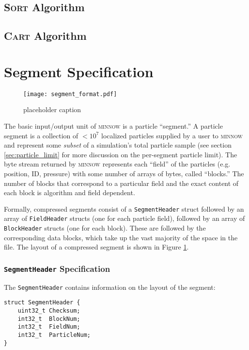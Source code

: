 \documentclass[numberedappendix,apj]{emulateapj}
\begin{document}
\subsection{\textsc{Sort} Algorithm}
\label{sec:sort}

\subsection{\textsc{Cart} Algorithm}
\label{sec:cart}

\section{Segment Specification}
\label{sec:segment_format}

\begin{figure}
   \centering
   \texttt{[image: segment\_format.pdf]}
   \caption{placeholder caption}
   \label{fig:segment_format}
\end{figure}

The basic input/output unit of \textsc{minnow} is a particle ``segment.'' A
particle segment is a collection of $< 10^7$ localized particles
supplied by a user to \textsc{minnow} and represent some \emph{subset} of a
simulation's total particle sample (see section \ref{sec:particle_limit} for
more discussion on the per-segment particle limit). The byte stream returned by
\textsc{minnow} represents each ``field'' of the particles (e.g. position, ID,
pressure) with some number of arrays of bytes, called ``blocks.'' The number of
blocks that correspond to a particular field and the exact content of each block
is algorithm and field dependent.

Formally, compressed segments consist of a \texttt{SegmentHeader} struct
followed by an array of \texttt{FieldHeader} structs (one for each particle
field), followed by an array of \texttt{BlockHeader} structs (one for each
block). These are followed by the corresponding data blocks, which take up the
vast majority of the space in the file. The layout of a compressed segment
is shown in Figure \ref{fig:segment_format}.

\subsubsection{\texttt{SegmentHeader} Specification}

The \texttt{SegmentHeader} contains information on the layout of the segment:

\begin{verbatim}
struct SegmentHeader {
    uint32_t Checksum;
    int32_t  BlockNum;
    int32_t  FieldNum;
    int32_t  ParticleNum;
}
\end{verbatim}
\end{document}
